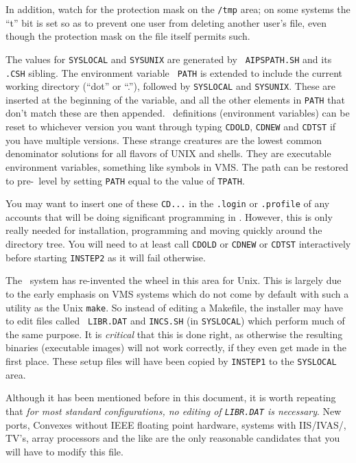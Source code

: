 In addition, watch for the protection mask on the {\tt /tmp} area; on
some systems the ``t'' bit is set so as to prevent one user from
deleting another user's file, even though the protection mask on the
file itself permits such.

The values for {\tt\dol SYSLOCAL} and {\tt\dol SYSUNIX} are generated by {\tt
AIPSPATH.SH} and its {\tt .CSH} sibling.  The environment variable {\tt
PATH} is extended to include the current working directory (``dot'' or
``.''), followed by {\tt\dol SYSLOCAL} and {\tt\dol SYSUNIX}.  These are
inserted at the beginning of the variable, and all the other elements in
{\tt PATH} that don't match these are then appended.  \AIPS\ definitions
(environment variables) can be reset to whichever version you want
through typing {\tt\dol CDOLD}, {\tt\dol CDNEW} and {\tt\dol CDTST} if you have
multiple versions.  These strange creatures are the lowest common
denominator solutions for all flavors of UNIX and shells.  They are
executable environment variables, something like symbols in VMS.  The
path can be restored to pre-\ttaips\ level by setting {\tt PATH} equal
to the value of {\tt TPATH}.

You may want to insert one of these {\tt\dol CD...} in the {\tt .login} or
{\tt .profile} of any accounts that will be doing significant
programming in \AIPS.  However, this is only really needed for
installation, programming and moving quickly around the directory tree.
You will need to at least call {\tt\dol CDOLD} or {\tt\dol CDNEW} or
{\tt\dol CDTST} interactively before starting {\tt INSTEP2} as it will fail
otherwise.
\medskip


The \aips\ system has re-invented the wheel in this area for Unix.  This
is largely due to the early emphasis on VMS systems which do not come by
default with such a utility as the Unix {\tt make}.  So instead of
editing a Makefile, the installer may have to edit files called {\tt
LIBR.DAT} and {\tt INCS.SH} (in {\tt\dol SYSLOCAL}) which perform much of
the same purpose.  It is {\it critical\/} that this is done right, as
otherwise the resulting binaries (executable images) will not work
correctly, if they even get made in the first place.  These setup files
will have been copied by {\tt INSTEP1} to the {\tt\dol SYSLOCAL} area.

Although it has been mentioned before in this document, it is worth
repeating that {\it for most standard configurations, no editing
of\/ {\tt LIBR.DAT} is necessary\/}.  New ports, Convexes without IEEE
floating point hardware, systems with IIS/IVAS/\etc, TV's, array
processors and the like are the only reasonable candidates that you will
have to modify this file.
\medskip

